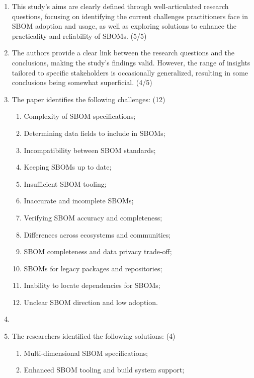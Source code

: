 \begin{enumerate}
    \item This study's aims are clearly defined through well-articulated research questions, focusing on identifying the current challenges practitioners face in SBOM adoption and usage, as well as exploring solutions to enhance the practicality and reliability of SBOMs. (5/5)
    \item The authors provide a clear link between the research questions and the conclusions, making the study's findings valid. However, the range of insights tailored to specific stakeholders is occasionally generalized, resulting in some conclusions being somewhat superficial. (4/5)
    \item The paper identifies the following challenges: (12)
            \begin{enumerate}[label=\Alph*.]
                \item Complexity of SBOM specifications;
                \item Determining data fields to include in SBOMs;
                \item Incompatibility between SBOM standards;
                \item Keeping SBOMs up to date;
                \item Insufficient SBOM tooling;
                \item Inaccurate and incomplete SBOMs;
                \item Verifying SBOM accuracy and completeness;
                \item Differences across ecosystems and communities;
                \item SBOM completeness and data privacy trade-off;
                \item SBOMs for legacy packages and repositories;
                \item Inability to locate dependencies for SBOMs;
                \item Unclear SBOM direction and low adoption.
            \end{enumerate}
    \item %
    \item The researchers identified the following solutions: (4)
            \begin{enumerate}[label=\Alph*.]
                \item Multi-dimensional SBOM specifications;
                \item Enhanced SBOM tooling and build system support;

\end{enumerate}
\end{enumerate}
